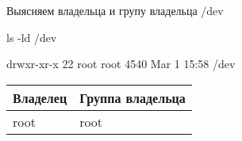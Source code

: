 Выясняем владельца и групу владельца /dev

\begin{BashBox}
    ls -ld /dev
\end{BashBox}

\begin{OutBox}
    drwxr-xr-x 22 root root 4540 Mar  1 15:58 /dev
\end{OutBox}

\begin{table}[h!]
    \centering
    \begin{tabular}{ | l | l | }
        \hline
        Владелец& Группа владельца  \\ \hline
        \hline
        root    & root              \\ \hline
    \end{tabular}
\end{table}
